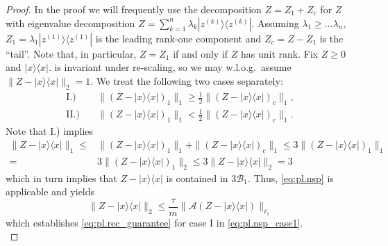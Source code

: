 \begin{proof}
In the proof we will frequently use the decomposition $ Z =  Z_1+ Z_c$ for $ Z$ with eigenvalue decomposition $ Z = \sum_{k=1}^n \lambda_k | z^{(k)} \rangle \! \langle  z^{(k)}|$.
Assuming $\lambda_1 \ge \ldots \lambda_n$, $Z_1 = \lambda_1 | z^{(1)} \rangle \! \langle  z^{(1)}|$ is the leading rank-one component and $ Z_c =  Z- Z_1$ is the ``tail''.
Note that, in particular, $ Z =  Z_1$ if and only if $ Z$ has unit rank.
Fix $ Z \geq 0$ and $|{x} \rangle \! \langle {x}|$.
 is invariant under re-scaling, so we may w.l.o.g.\ assume $\|  Z-|{x} \rangle \! \langle {x}|\|_2=1$.
We treat the following two cases separately:
\begin{align}
  \mathrm{I.)} \quad& \| ( Z-|{x} \rangle \! \langle {x}|)_1 \|_1 \geq \frac{1}{2} \| ( Z-|{x} \rangle \! \langle {x}|)_c \|_1, \label{eq:pl.nsp_case1} \\
  \mathrm{II.)} \quad & \| ( Z-|{x} \rangle \! \langle {x}|)_1 \|_1 < \frac{1}{2} \| ( Z-|{x} \rangle \! \langle {x}|)_c \|_1. \label{eq:pl.nsp_case2}
\end{align}
Note that I.) implies
\begin{align}
  \|  Z-|{x} \rangle \! \langle {x}| \|_1 \leq &\| ( Z-|{x} \rangle \! \langle {x}|)_1 \|_1 + \| ( Z-|{x} \rangle \! \langle {x}|)_c \|_1 \leq 3 \| ( Z-|{x} \rangle \! \langle {x}|)_1 \|_1 \\
  = & 3 \| ( Z-|{x} \rangle \! \langle {x}|)_1 \|_2 \leq 3 \|  Z- |{x} \rangle \! \langle {x}| \|_2 = 3
\end{align}
which in turn implies that $ Z-| {x} \rangle \! \langle {x}|$ is contained in $3 \mathcal{B}_1$.
Thus, \eqref{eq:pl.nsp} is applicable and yields
\[
\|  Z - |{x} \rangle \! \langle {x}| \|_2 \leq  \frac{\tau}{m} \| \mathcal{A}( Z-|{x} \rangle \! \langle {x}|) \|_{\ell_1}
\]
which establishes \cref{eq:pl.rec_guarantee} for case I in \eqref{eq:pl.nsp_case1}.\\




\end{proof}
